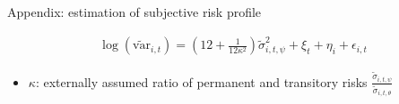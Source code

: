 \documentclass{beamer}
\begin{document}
\begin{frame}{Appendix: estimation of subjective risk profile}
	\label{appendix:RegimeEstimationDetail}
	
	\begin{equation*}
		\begin{split}
				\log(\tilde {\text{var}}_{i,t})= (12+\frac{1}{12\kappa^2})\tilde \sigma^2_{i,t,\psi} + \xi_{t}+\eta_{i}+ \epsilon_{i,t}
			\end{split}
	\end{equation*}
	\begin{itemize}
		
		\item $\kappa$: externally assumed ratio of permanent and transitory risks $\frac{\tilde \sigma_{i,t,\psi}}{\tilde \sigma_{i,t,\theta}}$
		\end{itemize}
	\hyperlink{RegimeEstimation}{} 
\end{frame}
\end{document}
